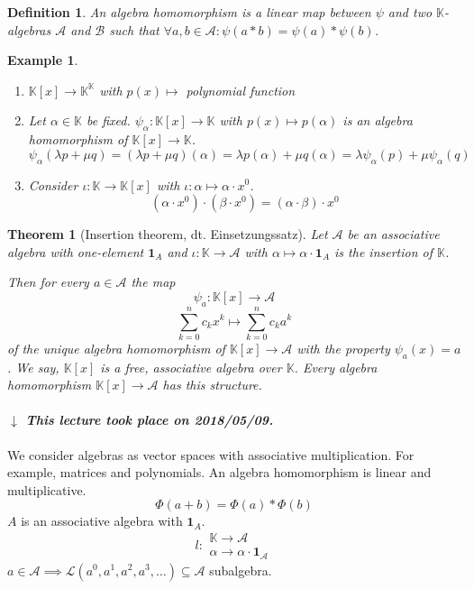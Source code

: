 \documentclass{article}
\newtheorem{theorem}{Theorem}  \numberwithin{theorem}{section}
\newtheorem{example}{Example}  \numberwithin{example}{section}
\newtheorem{definition}{Definition}  \numberwithin{definition}{section}
\newcommand{\dateref}[1]{%
  \begin{mdframed}[backgroundcolor=gray!10,innerbottommargin=0pt,innertopmargin=0pt]
    \paragraph{\textit{$\downarrow$ This lecture took place on #1.}}%
  \end{mdframed}%
}
\begin{document}
\begin{definition} %
  An algebra homomorphism is a linear map between $\psi$ and two $\mathbb K$-algebras $\mathcal A$ and $\mathcal B$ such that
  $\forall a,b \in \mathcal A: \psi(a * b) = \psi(a) * \psi(b)$.
\end{definition}

\begin{example} %
  \begin{enumerate}
    \item $\mathbb K[x] \to \mathbb K^{\mathbb K}$ with $p(x) \mapsto$ polynomial function
    \item
      Let $\alpha \in \mathbb K$ be fixed.
      $\psi_{\alpha}: \mathbb K[x] \to \mathbb K$ with $p(x) \mapsto p(\alpha)$ is an algebra homomorphism of $\mathbb K[x] \to \mathbb K$.
      \[ \psi_\alpha(\lambda p + \mu q) = (\lambda p + \mu q)(\alpha) = \lambda p(\alpha) + \mu q(\alpha) = \lambda \psi_{\alpha}(p) + \mu \psi_{\alpha}(q) \]
    \item Consider $\iota: \mathbb K \to \mathbb K[x]$ with $\iota: \alpha \mapsto \alpha \cdot x^0$.
      \[ (\alpha \cdot x^0) \cdot (\beta \cdot x^0) = (\alpha \cdot \beta) \cdot x^0 \]
  \end{enumerate}
\end{example}

\begin{theorem}[Insertion theorem, dt. \foreignlanguage{german}{Einsetzungssatz}] %
  Let $\mathcal A$ be an associative algebra with one-element $\mathbf 1_A$
  and $\iota: \mathbb K \to \mathcal A$ with $\alpha \mapsto \alpha \cdot \mathbf 1_A$ is the insertion of $\mathbb K$.

  Then for every $a \in \mathcal A$ the map
  \[ \psi_a: \mathbb K[x] \to \mathcal A \]
  \[ \sum_{k=0}^n c_k x^k \mapsto \sum_{k=0}^n c_k a^k \]
  of the unique algebra homomorphism of $\mathbb K[x] \to \mathcal A$ with the property $\psi_a(x) = a$.
  We say, $\mathbb K[x]$ is a \emph{free, associative algebra over $\mathbb K$}.
  Every algebra homomorphism $\mathbb K[x] \to \mathcal A$ has this structure.
\end{theorem}

\dateref{2018/05/09}

We consider algebras as vector spaces with associative multiplication. For example, matrices and polynomials.
An algebra homomorphism is linear and multiplicative.
\[ \Phi(a + b)= \Phi(a) * \Phi(b) \]
$A$ is an associative algebra with $\mathbf 1_A$.
\[ l: \substack{\mathbb K \to \mathcal A \\ \alpha \to \alpha \cdot \mathbf 1_{\mathcal A}} \]
$a \in \mathcal A \implies \mathcal L(a^0, a^1, a^2, a^3, \dots) \subseteq \mathcal A$ subalgebra.
\end{document}
